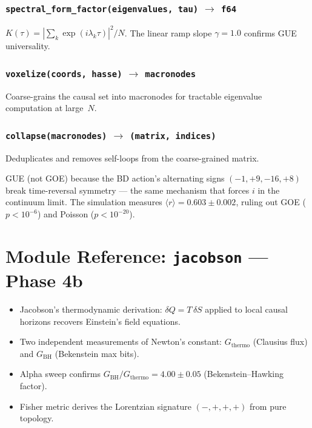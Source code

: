 \documentclass[11pt, a4paper, openany]{book}
\newcommand{\code}[1]{\texttt{#1}}
\newcommand{\func}[1]{\texttt{\color{structure}#1}}
\newcommand{\modname}[1]{\texttt{\bfseries\color{main}#1}}
\newenvironment{introduction}[1][Chapter Overview]{%
  \begin{tcolorbox}[
    enhanced,colback=structure!5,colframe=structure,
    colbacktitle=structure,coltitle=white,
    fonttitle=\small\bfseries,title={#1},
    arc=2pt,boxrule=0.7pt,
    left=8pt,right=8pt,top=6pt,bottom=6pt,
    before skip=12pt,after skip=12pt
  ]\itshape\begin{itemize}[leftmargin=*,itemsep=2pt,parsep=0pt]
}{%
  \end{itemize}\end{tcolorbox}
}
\begin{document}
\subsection{\func{spectral\_form\_factor(eigenvalues, tau)} $\to$ \code{f64}}

$K(\tau) = |\sum_k \exp(i \lambda_k \tau)|^2 / N$.  The linear ramp slope
$\gamma = 1.0$ confirms GUE universality.

\subsection{\func{voxelize(coords, hasse)} $\to$ \code{macronodes}}

Coarse-grains the causal set into macronodes for tractable eigenvalue computation
at large~$N$.

\subsection{\func{collapse(macronodes)} $\to$ \code{(matrix, indices)}}

Deduplicates and removes self-loops from the coarse-grained matrix.

\begin{result}
GUE (not GOE) because the BD action's alternating signs $(-1, +9, -16, +8)$ break
time-reversal symmetry --- the same mechanism that forces $i$ in the continuum limit.
The simulation measures $\langle r \rangle = 0.603 \pm 0.002$, ruling out GOE
($p < 10^{-6}$) and Poisson ($p < 10^{-20}$).
\end{result}


\chapter{Module Reference: \modname{jacobson} --- Phase 4b}

\begin{introduction}[Emergent Einstein Equations]
  \item Jacobson's thermodynamic derivation: $\delta Q = T\,\delta S$ applied to local causal horizons recovers Einstein's field equations.
  \item Two independent measurements of Newton's constant: $G_\text{thermo}$ (Clausius flux) and $G_\text{BH}$ (Bekenstein max bits).
  \item Alpha sweep confirms $G_\text{BH} / G_\text{thermo} = 4.00 \pm 0.05$ (Bekenstein--Hawking factor).
  \item Fisher metric derives the Lorentzian signature $(-,+,+,+)$ from pure topology.
\end{introduction}
\end{document}
